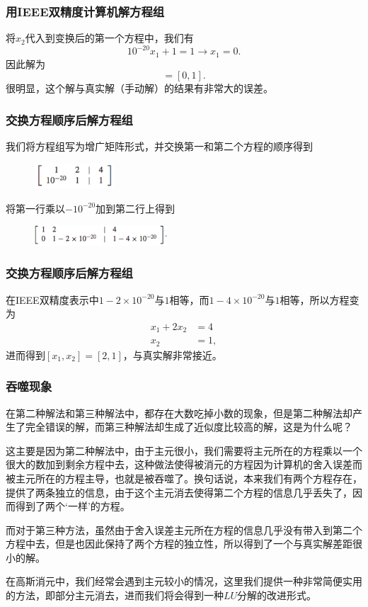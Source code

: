 \documentclass[10pt]{beamer}
\begin{document}
\begin{frame}
\frametitle{用IEEE双精度计算机解方程组}
将$x_2$代入到变换后的第一个方程中，我们有
\begin{equation}
10^{-20} x_1 +1 = 1  \rightarrow x_1 = 0.
\end{equation}
因此解为
\begin{equation}
[x_1, x_2] = [0,1].
\end{equation}
很明显，这个解与真实解（手动解）的结果有非常大的误差。
\end{frame}


\begin{frame}
\frametitle{交换方程顺序后解方程组}
我们将方程组写为增广矩阵形式，并交换第一和第二个方程的顺序得到
\begin{figure}
\includegraphics[width=3cm]{figs/2_3_Swamping-6} 
\end{figure}
将第一行乘以$-10^{-20}$加到第二行上得到
\begin{figure}
\includegraphics[width=5cm]{figs/2_3_Swamping-7} 
\end{figure}
\end{frame}


\begin{frame}
\frametitle{交换方程顺序后解方程组}
在IEEE双精度表示中$1- 2\times10^{-20}$与$1$相等，而$1- 4\times 10^{-20}$与$1$相等，所以方程变为
\begin{align}
x_1 + 2x_2 &= 4 \nonumber \\
            x_2 & =1,
\end{align}
进而得到$[x_1,x_2 ] = [2,1]$，与真实解非常接近。
\end{frame}


\begin{frame}
\frametitle{吞噬现象}
在第二种解法和第三种解法中，都存在大数吃掉小数的现象，但是第二种解法却产生了完全错误的解，而第三种解法却生成了近似度比较高的解，这是为什么呢？

这主要是因为第二种解法中，由于主元很小，我们需要将主元所在的方程乘以一个很大的数加到剩余方程中去，这种做法使得被消元的方程因为计算机的舍入误差而被主元所在的方程主导，也就是被吞噬了。换句话说，本来我们有两个方程存在，提供了两条独立的信息，由于这个主元消去使得第二个方程的信息几乎丢失了，因而得到了两个‘一样’的方程。

而对于第三种方法，虽然由于舍入误差主元所在方程的信息几乎没有带入到第二个方程中去，但是也因此保持了两个方程的独立性，所以得到了一个与真实解差距很小的解。

在高斯消元中，我们经常会遇到主元较小的情况，这里我们提供一种非常简便实用的方法，即部分主元消去，进而我们将会得到一种$LU$分解的改进形式。
\end{frame}
\end{document}
